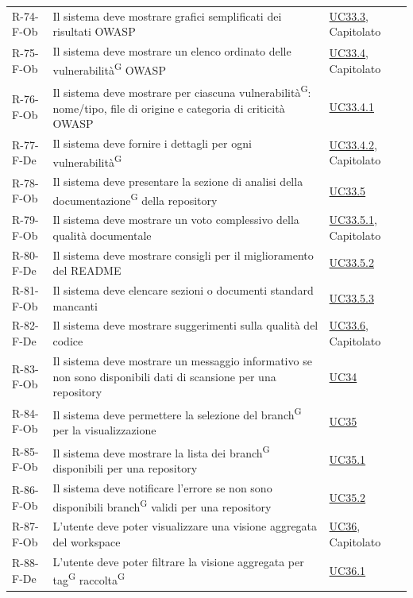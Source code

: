 \documentclass[a4paper, 11pt]{article}
\begin{document}
\begin{longtable}[c]{ >{\centering\arraybackslash}m{2.5cm} >{\centering\arraybackslash}m{8.3cm} >{\centering\arraybackslash}m{3.5cm} }
    R-74-F-Ob & Il sistema deve mostrare grafici semplificati dei risultati OWASP & \hyperref[UC33.3]{UC33.3}, Capitolato \\
    R-75-F-Ob & Il sistema deve mostrare un elenco ordinato delle vulnerabilità\textsuperscript{G} OWASP & \hyperref[UC33.4]{UC33.4}, Capitolato \\
    R-76-F-Ob & Il sistema deve mostrare per ciascuna vulnerabilità\textsuperscript{G}: nome/tipo, file di origine e categoria di criticità OWASP & \hyperref[UC33.4.1]{UC33.4.1} \\
    R-77-F-De & Il sistema deve fornire i dettagli per ogni vulnerabilità\textsuperscript{G} & \hyperref[UC33.4.2]{UC33.4.2}, Capitolato \\
    R-78-F-Ob & Il sistema deve presentare la sezione di analisi della documentazione\textsuperscript{G} della repository & \hyperref[UC33.5]{UC33.5} \\
    R-79-F-Ob & Il sistema deve mostrare un voto complessivo della qualità documentale & \hyperref[UC33.5.1]{UC33.5.1}, Capitolato \\
    R-80-F-De & Il sistema deve mostrare consigli per il miglioramento del README & \hyperref[UC33.5.2]{UC33.5.2} \\
    R-81-F-Ob & Il sistema deve elencare sezioni o documenti standard mancanti & \hyperref[UC33.5.3]{UC33.5.3} \\
    R-82-F-De & Il sistema deve mostrare suggerimenti sulla qualità del codice & \hyperref[UC33.6]{UC33.6}, Capitolato \\
    R-83-F-Ob & Il sistema deve mostrare un messaggio informativo se non sono disponibili dati di scansione per una repository & \hyperref[UC34]{UC34} \\
    R-84-F-Ob & Il sistema deve permettere la selezione del branch\textsuperscript{G} per la visualizzazione & \hyperref[UC35]{UC35} \\
    R-85-F-Ob & Il sistema deve mostrare la lista dei branch\textsuperscript{G} disponibili per una repository & \hyperref[UC35.1]{UC35.1} \\
    R-86-F-Ob & Il sistema deve notificare l'errore se non sono disponibili branch\textsuperscript{G} validi per una repository & \hyperref[UC35.2]{UC35.2} \\
    R-87-F-Ob & L'utente deve poter visualizzare una visione aggregata del workspace & \hyperref[UC36]{UC36}, Capitolato \\
    R-88-F-De & L'utente deve poter filtrare la visione aggregata per tag\textsuperscript{G} raccolta\textsuperscript{G} & \hyperref[UC36.1]{UC36.1} \\

\end{longtable}
\end{document}
